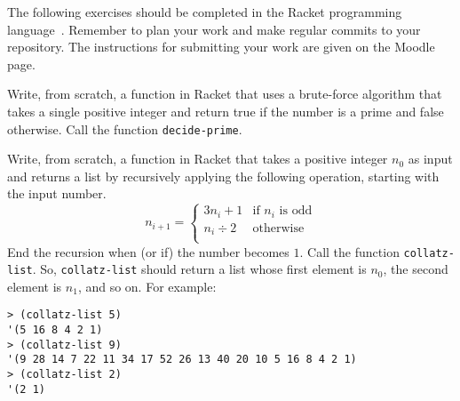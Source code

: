 \documentclass[a4paper, 12pt]{exam}
\begin{document}
\noindent
The following exercises should be completed in the Racket programming language~\cite{racketwebsite}.
Remember to plan your work and make regular commits to your repository.
The instructions for submitting your work are given on the Moodle page.

\begin{questions}

\question
Write, from scratch, a function in Racket that uses a brute-force algorithm that takes a single positive integer and return true if the number is a prime and false otherwise. Call the function \texttt{decide-prime}.


\question
Write, from scratch, a function in Racket that takes a positive integer $n_0$ as input and returns a list by recursively applying the following operation, starting with the input number.
$$
n_{i+1} =
\left\{
  \begin{array}{ll}
    3n_i + 1 & \textrm{if } n_i \textrm{ is odd}  \\
		n_i \div 2 & \textrm{otherwise} \\
	\end{array}
\right.
$$
End the recursion when (or if) the number becomes $1$.
Call the function \texttt{collatz-list}.
So, \texttt{collatz-list} should return a list whose first element is $n_0$, the second element is $n_1$, and so on.
For example:
\begin{verbatim}
> (collatz-list 5)
'(5 16 8 4 2 1)
> (collatz-list 9)
'(9 28 14 7 22 11 34 17 52 26 13 40 20 10 5 16 8 4 2 1)
> (collatz-list 2)
'(2 1)
\end{verbatim}


\end{questions}



\end{document}
